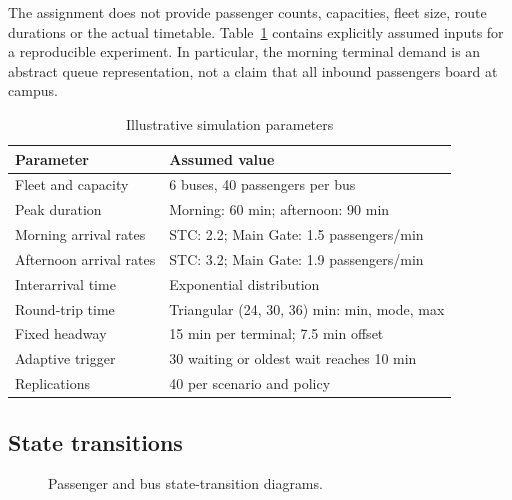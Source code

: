\documentclass[conference]{IEEEtran}
\begin{document}
The assignment does not provide passenger counts, capacities, fleet size, route durations or the actual timetable. Table~\ref{tab:inputs} contains explicitly assumed inputs for a reproducible experiment. In particular, the morning terminal demand is an abstract queue representation, not a claim that all inbound passengers board at campus.
\begin{table}[h]
\caption{Illustrative simulation parameters}\label{tab:inputs}
\centering\footnotesize
\begin{tabularx}{\columnwidth}{@{}lX@{}}\toprule
Parameter & Assumed value\\\midrule
Fleet and capacity & 6 buses, 40 passengers per bus\\
Peak duration & Morning: 60 min; afternoon: 90 min\\
Morning arrival rates & STC: 2.2; Main Gate: 1.5 passengers/min\\
Afternoon arrival rates & STC: 3.2; Main Gate: 1.9 passengers/min\\
Interarrival time & Exponential distribution\\
Round-trip time & Triangular (24, 30, 36) min: min, mode, max\\
Fixed headway & 15 min per terminal; 7.5 min offset\\
Adaptive trigger & 30 waiting or oldest wait reaches 10 min\\
Replications & 40 per scenario and policy\\\bottomrule
\end{tabularx}
\end{table}
\subsection{State transitions}
\begin{figure}[h]
\centering
{}
\caption{Passenger and bus state-transition diagrams.}
\end{figure}
\end{document}
